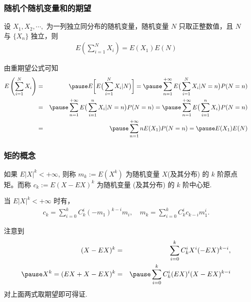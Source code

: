 \begin{frame}
	\frametitle{随机个随机变量和的期望}
	\begin{thm}
		设 $X_1,X_2,\cdots,$ 为一列独立同分布的随机变量，随机变量 $N$ 只取正整数值，且 $N$ 与 $\{X_n\}$ 独立，则
		\begin{eqnarray*}
			E\left(\sum_{i=1}^NX_i\right)=E(X_1)E(N)
		\end{eqnarray*}
	\end{thm}

	\pause \zheng 由重期望公式可知
	\begin{eqnarray*}
		E\left(\sum_{i=1}^NX_i\right)&=&\pause E\bigg[ E\big(\sum_{i=1}^NX_i|N\big)\bigg]=\pause \sum_{n=1}^{+\infty}E\big(\sum_{i=1}^NX_i|N=n\big)P(N=n)\\
		&=&\pause \sum_{n=1}^{+\infty}E\big(\sum_{i=1}^nX_i|N=n\big)P(N=n)=\pause \sum_{n=1}^{+\infty}E\big(\sum_{i=1}^nX_i\big)P(N=n)\\
		&=&\pause \sum_{n=1}^{+\infty}nE(X_1)P(N=n)=\pause E(X_1)E(N)\\
	\end{eqnarray*}

\end{frame}
\begin{frame}
	\frametitle{矩的概念}
	\begin{defi}
		如果 $E|X|^k<+\infty$, 则称 $m_k:=E (X^k)$ 为随机变量 $X$(及其分布) 的 $k$ 阶原点矩。而称 $c_k:=E (X-EX)^k$ 为随机变量 (及其分布) 的 $k$ 阶中心矩.
	\end{defi}
	\pause
	\begin{thm}
		当 $E|X|^k<+\infty$ 时有，
		\begin{eqnarray*}
			c_k=\sum_{i=0}^kC_k^i(-m_1)^{k-i}m_i, \quad m_k=\sum_{i=0}^kC_k^ic_{k-i}m_1^i.
		\end{eqnarray*}

	\end{thm}
	\pause
	\zheng 注意到 \pause
	\begin{eqnarray*}
		(X-EX)^k&=&\sum_{i=0}^kC_k^iX^i(-EX)^{k-i}, \\
		\pause X^k=(EX+X-EX)^k&=&\pause \sum_{i=0}^kC_k^i(EX)^i(X-EX)^{k-i}
	\end{eqnarray*}
	\pause 对上面两式取期望即可得证.
\end{frame}
